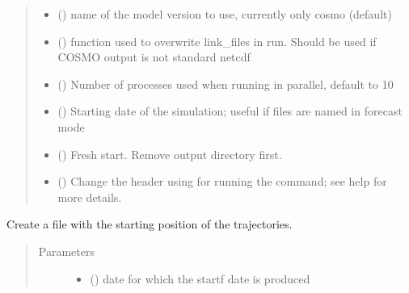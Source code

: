 \documentclass[a4paper,10pt,english]{sphinxmanual}
\begin{document}
\begin{fulllineitems}
\begin{quote}
\begin{description}
\begin{itemize}
\item {} 
 (\sphinxstyleliteralemphasis{, }) \textendash{} name of the model version to use, currently only cosmo (default)

\item {} 
 (\sphinxstyleliteralemphasis{, }) \textendash{} function used to overwrite link\_files in run.
Should be used if COSMO output is not standard netcdf

\item {} 
 (\sphinxstyleliteralemphasis{, }) \textendash{} Number of processes used when running in parallel, default to 10

\item {} 
 (\sphinxstyleliteralemphasis{,}) \textendash{} Starting date of the simulation;
useful if files are named in forecast mode

\item {} 
 (\sphinxstyleliteralemphasis{, }) \textendash{} Fresh start. Remove output directory first.

\item {} 
 (\sphinxstyleliteralemphasis{, }) \textendash{} Change the header using for running the command;
see  help for more details.

\end{itemize}

\end{description}\end{quote}

\begin{fulllineitems}
\label{\detokenize{lagranto:lagranto.LagrantoRun.create_startf}}
Create a file with the starting position of the trajectories.
\begin{quote}\begin{description}
\item[{Parameters}] \leavevmode\begin{itemize}
\item {} 
 () \textendash{} date for which the startf date is produced


\end{itemize}
\end{description}
\end{quote}
\end{fulllineitems}
\end{fulllineitems}
\end{document}
